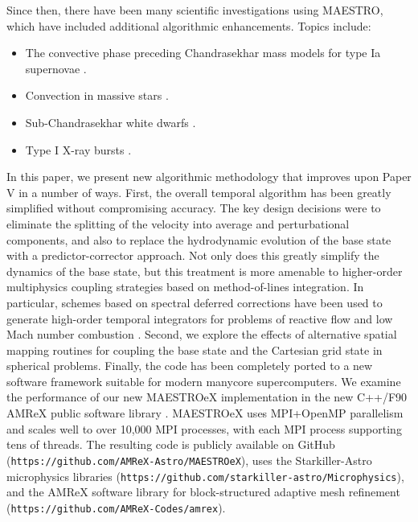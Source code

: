 Since then, there have been many scientific investigations using MAESTRO, which have included additional algorithmic enhancements.  Topics include:
\begin{itemize}
\item The convective phase preceding Chandrasekhar mass models for type Ia supernovae \citep{MAESTRO_convection,MAESTRO_AMR,MAESTRO_CASTRO}.
\item Convection in massive stars \citep{Gilet:2013}.
\item Sub-Chandrasekhar white dwarfs \citep{subChandra_I,subChandra_II}.
\item Type I X-ray bursts \citep{XRB_I,XRB_II,XRB_III}.
\end{itemize}

In this paper, we present new algorithmic methodology that improves upon Paper V in a number of ways.
First, the overall temporal algorithm has been greatly simplified without compromising accuracy.
The key design decisions were to eliminate the splitting of the velocity into average and perturbational components, 
and also to replace the hydrodynamic evolution of the base state with a predictor-corrector approach.
Not only does this greatly simplify the dynamics of the base
state, but this treatment is more amenable to higher-order multiphysics coupling strategies
based on method-of-lines integration.  
In particular, schemes based on spectral deferred corrections \citep{dutt2000spectral} have been used to generate high-order temporal integrators for problems of reactive flow \citep{dutt2000spectral} and low Mach number combustion \citep{pazner2016high,nonaka2018conservative}.
Second, we explore the effects of alternative spatial mapping routines for coupling the base state and the Cartesian grid state in spherical problems.
Finally, the code has been completely ported to a new software framework suitable for modern manycore supercomputers.
We examine the performance of our new MAESTROeX implementation in the new C++/F90 AMReX public software library \cite{AMReX}.
MAESTROeX uses MPI+OpenMP parallelism and scales well to over 10,000 MPI processes, with each MPI process supporting tens of threads.
The resulting code is publicly available on GitHub ({\tt https://github.com/AMReX-Astro/MAESTROeX}),
uses the Starkiller-Astro microphysics libraries ({\tt https://github.com/starkiller-astro/Microphysics}),
and the AMReX software library for block-structured adaptive mesh refinement ({\tt https://github.com/AMReX-Codes/amrex}).

